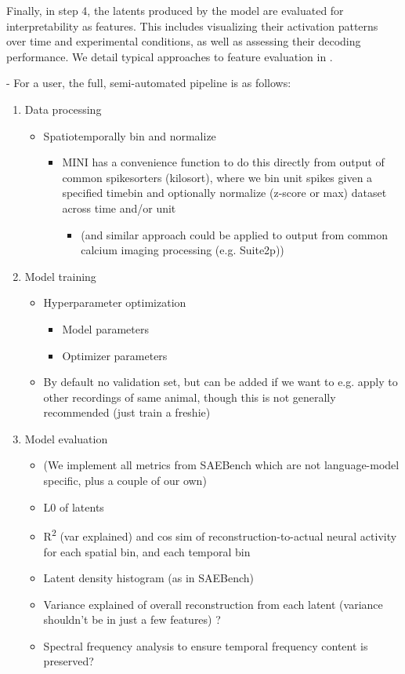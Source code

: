 Finally, in step 4, the latents produced by the model are evaluated for interpretability as features. This includes visualizing their activation patterns over time and experimental conditions, as well as assessing their decoding performance. We detail typical approaches to feature evaluation in .

- For a user, the full, semi-automated pipeline is as follows:
\begin{enumerate}
    \item Data processing
    \begin{itemize}
        \item Spatiotemporally bin and normalize
        \begin{itemize}
            \item MINI has a convenience function to do this directly from output of common spikesorters (kilosort), where we bin unit spikes given a specified timebin and optionally normalize (z-score or max) dataset across time and/or unit
            \begin{itemize}
                \item (and similar approach could be applied to output from common calcium imaging processing (e.g. Suite2p))
            \end{itemize}
        \end{itemize}
    \end{itemize}
    
    \item Model training
    \begin{itemize}
        \item Hyperparameter optimization
        \begin{itemize}
            \item Model parameters
            \item Optimizer parameters
        \end{itemize}
        \item By default no validation set, but can be added if we want to e.g. apply to other recordings of same animal, though this is not generally recommended (just train a freshie)
    \end{itemize}
    
    \item Model evaluation
    \begin{itemize}
        \item (We implement all metrics from SAEBench which are not language-model specific, plus a couple of our own)
        \item L0 of latents
        \item R\textsuperscript{2} (var explained) and cos sim of reconstruction-to-actual neural activity for each spatial bin, and each temporal bin
        \item Latent density histogram (as in SAEBench)
        \item Variance explained of overall reconstruction from each latent (variance shouldn't be in just a few features) ?
        \item Spectral frequency analysis to ensure temporal frequency content is preserved?
    \end{itemize}
    

\end{enumerate}
